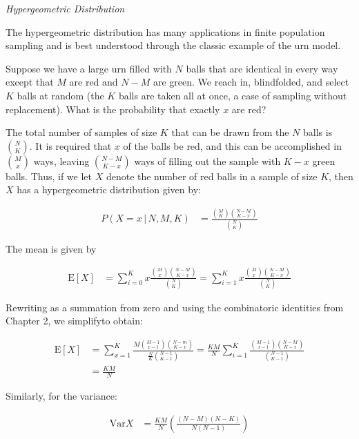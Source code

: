 \documentclass[11pt,a4paper]{report}
\theoremstyle{definition}
\theoremstyle{theorem}
\theoremstyle{example}
\begin{document}
\textit{Hypergeometric Distribution}

The hypergeometric distribution has many applications in finite population sampling and is best understood through the classic example of the urn model.

Suppose we have a large urn filled with $N$ balls that are identical in every way except that $M$ are red and $N-M$ are green.  We reach in, blindfolded, and select $K$ balls at random (the $K$ balls are taken all at once, a case of sampling without replacement).  What is the probability that exactly $x$ are red?

The total number of samples of size $K$ that can be drawn from the $N$ balls is ${N \choose K}$.  It is required that $x$ of the balls be red, and this can be accomplished in ${M \choose x}$ ways, leaving ${N-M \choose K-x}$ ways of filling out the sample with $K-x$ green balls.  Thus, if we let $X$ denote the number of red balls in a sample of size $K$, then $X$ has a hypergeometric distribution given by:

\begin{align*}
  P(X = x \, | \, N, M, K) &= \frac{{M \choose K} {N-M \choose K-x}}{{N \choose K}}
\end{align*}

The mean is given by

\begin{align*}
  \mathrm{E} \left[ X \right] &= \sum_{i=0}^K x \frac{{M \choose x} {N-M \choose K-x}}{{N \choose K}} = \sum_{i=1}^K x \frac{{M \choose x} {N-M \choose K-x}}{{N \choose K}}
\end{align*}

Rewriting as a summation from zero and using the combinatoric identities from Chapter 2, we simplifyto obtain:

\begin{align*}
  \mathrm{E} \left[ X \right] &= \sum_{x=1}^K \frac{M {M-1 \choose x-1}{N-m \choose K-x}}{\frac{N}{K}{N-1 \choose K-1}} = \frac{KM}{N} \sum_{i=1}^K \frac{{M-1 \choose x-1}{N-M \choose K-x}}{{N-1 \choose K-1}} \\
  &= \frac{KM}{N}
\end{align*}

Similarly, for the variance:

\begin{align*}
  \mathrm{Var} X &= \frac{KM}{N} \left( \frac{(N-M)(N-K)}{N(N-1)} \right)
\end{align*}
\end{document}
